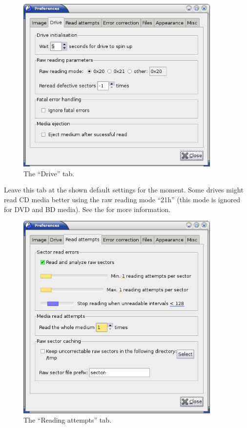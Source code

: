 \begin{figure}[h]
\centerline{\includegraphics[width=0.9\textwidth]{screenshots/recover-prefs-drive.png}}
\caption{The ``Drive'' tab.}  
\label{howto-recover-prefs-drive}
\end{figure}

Leave this tab at the shown default settings for the moment.
Some drives might read CD media better using the raw reading
mode ``21h'' (this mode is ignored for DVD and BD media).
See the  for more information.

\newpage

\begin{figure}[h]
\centerline{\includegraphics[width=0.9\textwidth]{screenshots/recover-prefs-read-attempts.png}}
\caption{The ``Reading attempts'' tab.}  
\label{howto-recover-prefs-read-attempts}
\end{figure}

